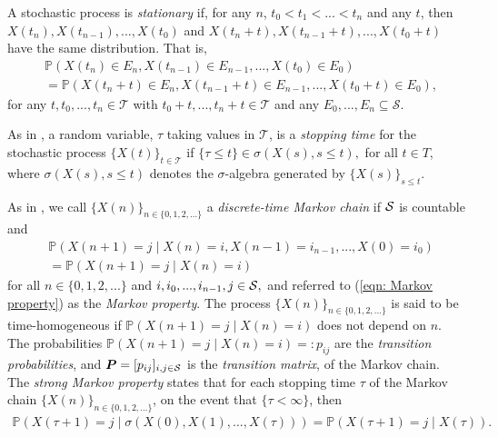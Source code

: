 A stochastic process is \emph{stationary} if, for any \(n\), \(t_0<t_1<...<t_n\) and any \(t\), then \(X(t_n),X(t_{n-1}),...,X(t_0)\) and \(X(t_n+t),X(t_{n-1}+t),...,X(t_0+t)\) have the same distribution. That is, 
\begin{align}\label{eqn: stationary}
	&\nonumber\mathbb P(X(t_n)\in E_n,X(t_{n-1})\in E_{n-1},...,X(t_0)\in E_0) 
	\\&= \mathbb P(X(t_n+t)\in E_n,X(t_{n-1}+t)\in E_{n-1},...,X(t_0+t)\in E_0),
\end{align}
for any \(t,t_0,...,t_n\in\mathcal T\) with \(t_0+t,...,t_n+t\in\mathcal T\) and any \(E_0,...,E_n\subseteq \mathcal S\). 

As in \cite[Section~2.1]{MEinAP}, a random variable, \(\tau\) taking values in \(\mathcal T\), is a \emph{stopping time} for the stochastic process \(\{X(t)\}_{t\in\mathcal T}\) if \(\{\tau\leq t\}\in\sigma(X(s), s\leq t),\) for all \(t\in T\), where \(\sigma(X(s), s\leq t)\) denotes the \(\sigma\)-algebra generated by \(\{X(s)\}_{s\leq t}\).

As in \cite[Section~1.2]{MEinAP}, we call \(\{X(n)\}_{n\in\{0,1,2,\dots\}}\) a \emph{discrete-time Markov chain} if \(\mathcal{S}\) is countable and
\begin{align}\label{eqn: Markov property}
	\nonumber &\mathbb P(X(n+1)=j \mid X(n)=i,X(n-1)=i_{n-1},...,X(0)=i_0) 
	\\&= \mathbb P(X(n+1)=j \mid X(n)=i) 
\end{align}
for all \(n\in\{0,1,2,...\}\) and \(i,i_0,...,i_{n-1},j\in\mathcal{S},\) and referred to (\ref{eqn: Markov property}) as the \emph{Markov property}. The process \(\{X(n)\}_{n\in\{0,1,2,...\}}\) is said to be time-homogeneous if 
\(\mathbb P(X(n+1)=j \mid X(n)=i)\) does not depend on \(n\). The probabilities \(\mathbb P(X(n+1)=j \mid X(n)=i)=:p_{ij}\) are the \emph{transition probabilities}, and \(\boldsymbol P=[p_{ij}]_{i,j\in\mathcal{S}}\) is the \emph{transition matrix}, of the Markov chain. The \emph{strong Markov property} states that for each stopping time \(\tau\) of the Markov chain \(\{X(n)\}_{n\in\{0,1,2,...\}}\), on the event that \(\{\tau<\infty\}\), then 
\begin{align}\label{eqn: strong Markov property}
	\mathbb P(X(\tau+1)=j \mid \sigma(X(0),X(1),...,X(\tau))) = \mathbb P(X(\tau+1)=j \mid X(\tau)).
\end{align}

